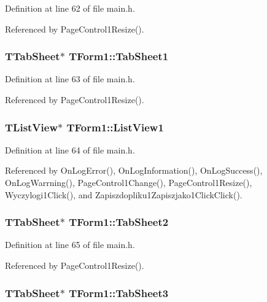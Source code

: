 Definition at line 62 of file main.h.

Referenced by PageControl1Resize().\hypertarget{classTForm1_6d1c57fe4450ad878c2a4d8f65ffc72a}{
\subsubsection[TabSheet1]{\setlength{\rightskip}{0pt plus 5cm}TTabSheet$\ast$ {\bf TForm1::TabSheet1}}}
\label{classTForm1_6d1c57fe4450ad878c2a4d8f65ffc72a}




Definition at line 63 of file main.h.

Referenced by PageControl1Resize().\hypertarget{classTForm1_10ab751cdcb401695d16b29bec7667da}{
\subsubsection[ListView1]{\setlength{\rightskip}{0pt plus 5cm}TListView$\ast$ {\bf TForm1::ListView1}}}
\label{classTForm1_10ab751cdcb401695d16b29bec7667da}




Definition at line 64 of file main.h.

Referenced by OnLogError(), OnLogInformation(), OnLogSuccess(), OnLogWarrning(), PageControl1Change(), PageControl1Resize(), Wyczylogi1Click(), and Zapiszdopliku1Zapiszjako1ClickClick().\hypertarget{classTForm1_bda9626de3a565ada75590e2a4072adb}{
\subsubsection[TabSheet2]{\setlength{\rightskip}{0pt plus 5cm}TTabSheet$\ast$ {\bf TForm1::TabSheet2}}}
\label{classTForm1_bda9626de3a565ada75590e2a4072adb}




Definition at line 65 of file main.h.

Referenced by PageControl1Resize().\hypertarget{classTForm1_9f711c2728656664dca851fae528647d}{
\subsubsection[TabSheet3]{\setlength{\rightskip}{0pt plus 5cm}TTabSheet$\ast$ {\bf TForm1::TabSheet3}}}
\label{classTForm1_9f711c2728656664dca851fae528647d}




